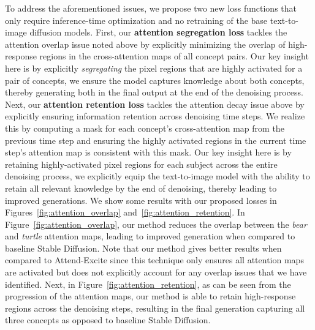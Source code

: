 \documentclass[10pt,twocolumn,letterpaper]{article}
\begin{document}
To address the aforementioned issues, we propose two new loss functions that only require inference-time optimization and no retraining of the base text-to-image diffusion models. First, our \textbf{attention segregation loss} tackles the attention overlap issue noted above by explicitly minimizing the overlap of high-response regions in the cross-attention maps of all concept pairs. Our key insight here is by explicitly \textit{segregating} the pixel regions that are highly activated for a pair of concepts, we ensure the model captures knowledge about both concepts, thereby generating both in the final output at the end of the denoising process. Next, our \textbf{attention retention loss} tackles the attention decay issue above by explicitly ensuring information retention across denoising time steps. We realize this by computing a mask for each concept's cross-attention map from the previous time step and ensuring the highly activated regions in the current time step's attention map is consistent with this mask. Our key insight here is by retaining highly-activated pixel regions for each subject across the entire denoising process, we explicitly equip the text-to-image model with the ability to retain all relevant knowledge by the end of denoising, thereby leading to improved generations. We show some results with our proposed losses in Figures~\ref{fig:attention_overlap} and~\ref{fig:attention_retention}. In Figure~\ref{fig:attention_overlap}, our method reduces the overlap between the \textit{bear} and \textit{turtle} attention maps, leading to improved generation when compared to baseline Stable Diffusion. Note that our method gives better results when compared to Attend-Excite \cite{chefer2023attend} since this technique only ensures all attention maps are activated but does not explicitly account for any overlap issues that we have identified. Next, in Figure~\ref{fig:attention_retention}, as can be seen from the progression of the attention maps, our method is able to retain high-response regions across the denoising steps, resulting in the final generation capturing all three concepts as opposed to baseline Stable Diffusion. 
\end{document}
